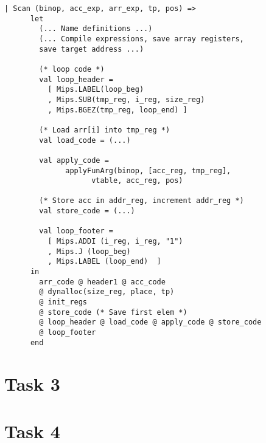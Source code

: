 \documentclass[10pt]{article}
\begin{document}
\begin{Verbatim}[frame=single]
  | Scan (binop, acc_exp, arr_exp, tp, pos) =>
      let
        (... Name definitions ...)
        (... Compile expressions, save array registers, 
        save target address ...)

        (* loop code *)
        val loop_header =
          [ Mips.LABEL(loop_beg)
          , Mips.SUB(tmp_reg, i_reg, size_reg)
          , Mips.BGEZ(tmp_reg, loop_end) ]
  
        (* Load arr[i] into tmp_reg *)
        val load_code = (...)
  
        val apply_code =
              applyFunArg(binop, [acc_reg, tmp_reg], 
              		vtable, acc_reg, pos)
  
        (* Store acc in addr_reg, increment addr_reg *)
        val store_code = (...)
              
        val loop_footer =
          [ Mips.ADDI (i_reg, i_reg, "1")
          , Mips.J (loop_beg)
          , Mips.LABEL (loop_end)  ]
      in
        arr_code @ header1 @ acc_code
        @ dynalloc(size_reg, place, tp)
        @ init_regs
        @ store_code (* Save first elem *)
        @ loop_header @ load_code @ apply_code @ store_code 
        @ loop_footer
      end
\end{Verbatim}

\section{Task 3}
\section{Task 4}

\begin{Verbatim}[frame=single]

\end{Verbatim}
\end{document}
